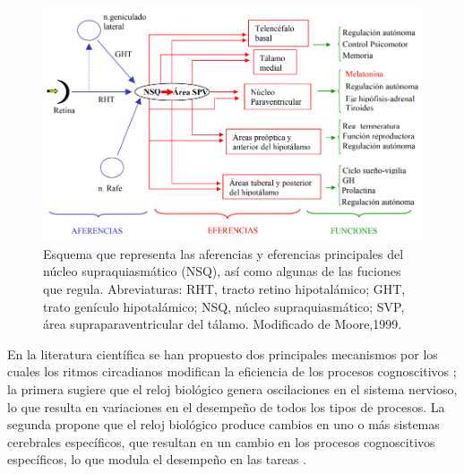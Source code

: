 \documentclass[12pt,letterpaper,final]{article}
\let\cite\cite %
\begin{document}
\begin{figure}[ht]
	\centering
	\includegraphics[scale=0.45]{Vias-NSQ.png}
\begin{footnotesize}	
	\caption{Esquema que representa las aferencias y eferencias principales del núcleo supraquiasmático
		(NSQ), así como algunas de las fuciones que regula. Abreviaturas: RHT, tracto retino hipotalámico; GHT,
		trato genículo hipotalámico; NSQ, núcleo supraquiasmático; SVP, área supraparaventricular del tálamo.
		Modificado de Moore,1999.}
	\label{fig:EstructuraNSQ}
	\end{footnotesize}
\end{figure}



En la literatura científica se han propuesto dos principales mecanismos por los cuales los ritmos circadianos modifican la eficiencia de los procesos cognoscitivos  \cite{Valdez2014}; la primera sugiere que el reloj biológico genera oscilaciones en el sistema nervioso, lo que resulta en variaciones en el desempeño de todos los tipos de procesos. La segunda propone que el reloj biológico produce cambios en uno o más sistemas cerebrales específicos, que resultan en un cambio en los procesos cognoscitivos  específicos, lo que modula el desempeño en las tareas \cite{Valdez2014}.
\end{document}

